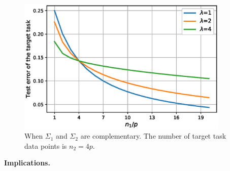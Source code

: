\begin{figure}
	\begin{minipage}{0.48\textwidth}
		\centering
		\includegraphics[width=0.9\textwidth]{figures/complementary.eps}
		\caption{When $\Sigma_1$ and $\Sigma_2$ are complementary. The number of target task data points is $n_2 = 4p$.}
		\label{fig_te_complement}
	\end{minipage}
\end{figure}

\textbf{Implications.}

